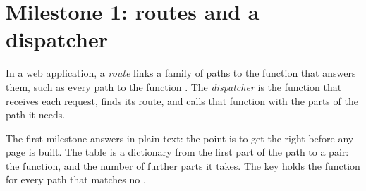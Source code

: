 \section{Milestone 1: routes and a dispatcher}\label{sec:g10:project-web-application:m1}

\begin{definition}\label{def:g10:project-web-application:route}
In a web application, a \emph{route} links a family of paths to the function that
answers them, such as every path  to the function . The
\emph{dispatcher} is the function that receives each request, finds its route, and calls that
function with the parts of the path it needs.
\end{definition}

The first milestone answers in plain text: the point is to get the  right before any page is built. The 
table is a dictionary from the first part of the path to a pair: the function, and the number of further parts it
takes. The key  holds the function for every path that matches no .

\label{lst:g10:project-web-application:m1}

\label{lst:g10:project-web-application:run-m1}

\label{out:g10:project-web-application:run-m1}

